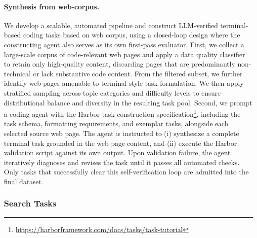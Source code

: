 
\paragraph{Synthesis from web-corpus.}
We develop a scalable, automated pipeline and construct LLM-verified terminal-based coding tasks based on web corpus, using a closed-loop design where the constructing agent also serves as its own first-pass evaluator.
First, we collect a large-scale corpus of code-relevant web pages and apply a data quality classifier to retain only high-quality content, discarding pages that are predominantly non-technical or lack substantive code content. From the filtered subset, we further identify web pages amenable to terminal-style task formulation. We then apply stratified sampling across topic categories and difficulty levels to ensure distributional balance and diversity in the resulting task pool.
Second, we prompt a coding agent with the Harbor task construction specification\footnote{\url{https://harborframework.com/docs/tasks/task-tutorial}}, including the task schema, formatting requirements, and exemplar tasks, alongside each selected source web page. The agent is instructed to (i) synthesize a complete terminal task grounded in the web page content, and (ii) execute the Harbor validation script against its own output. Upon validation failure, the agent iteratively diagnoses and revises the task until it passes all automated checks. Only tasks that successfully clear this self-verification loop are admitted into the final dataset.

\subsubsection{Search Tasks}

